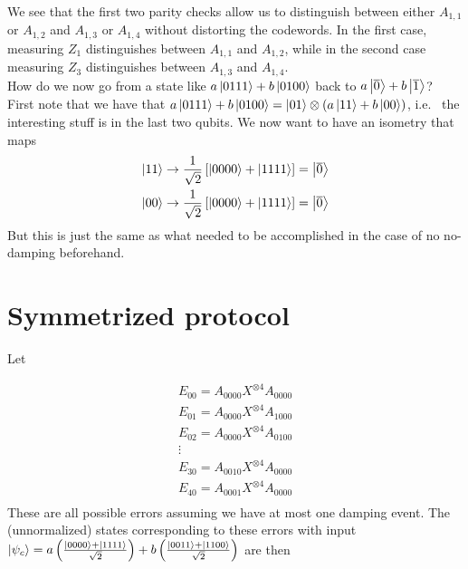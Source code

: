 \documentclass[twoside]{article}
\begin{document}
We see that the first two parity checks allow us to distinguish between either $A_{1,1}$ or $A_{1,2}$ and $A_{1,3}$ or $A_{1,4}$ without distorting the codewords. In the first case, measuring $Z_1$ distinguishes between $A_{1,1}$ and $A_{1,2}$, while in the second case measuring $Z_3$ distinguishes between $A_{1,3}$ and $A_{1,4}$.\\

How do we now go from a state like $a\Ket{0111}+b\Ket{0100}$ back to $a\Ket{\overline{0}}+b\Ket{\overline{1}}$? First note that  we have that $a\Ket{0111}+b\Ket{0100} = \Ket{01}\otimes \left(a\Ket{11}+b\Ket{00}\right)$, i.e.~ the interesting stuff is in the last two qubits. We now want to have an isometry that maps
\begin{align}
\Ket{11} \rightarrow \frac{1}{\sqrt{2}}\left[\Ket{0000}+\Ket{1111}\right] = \Ket{\overline{0}}\\
\Ket{00} \rightarrow \frac{1}{\sqrt{2}}\left[\Ket{0000}+\Ket{1111}\right] = \Ket{\overline{0}}
\end{align}
But this is just the same as what needed to be accomplished in the case of no no-damping beforehand.

\newpage
\section{Symmetrized protocol}
Let 

\begin{gather}
E_{00} = A_{0000} X^{\otimes 4} A_{0000}\\
E_{01} = A_{0000} X^{\otimes 4} A_{1000}\\
E_{02} = A_{0000} X^{\otimes 4} A_{0100}\\
\vdots\\
E_{30} = A_{001	0} X^{\otimes 4} A_{0000}\\
E_{40} = A_{0001} X^{\otimes 4} A_{0000}\\
\end{gather}
These are all possible errors assuming we have at most one damping event. The (unnormalized) states corresponding to these errors with input $\Ket{\psi_c} = a\left(\frac{\Ket{0000}+\Ket{1111}}{\sqrt{2}}\right)+b\left(\frac{\Ket{0011}+\Ket{1100}}{\sqrt{2}}\right)$ are then
\end{document}
